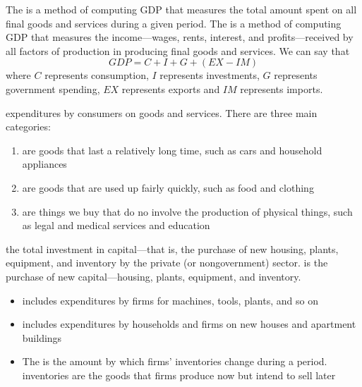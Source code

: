 \documentclass{article}
\begin{document}
The  is a method of computing GDP that measures the total amount spent on all final goods and services during a given period. The  is a method of computing GDP that measures the income---wages, rents, interest, and profits---received by all factors of production in producing final goods and services. We can say that $$GDP = C + I + G + (EX - IM)$$ where $C$ represents consumption, $I$ represents investments, $G$ represents government spending, $EX$ represents exports and $IM$ represents imports. 

\begin{definition}
  expenditures by consumers on goods and services. There are three main categories:
  \begin{enumerate}
    \item {} are goods that last a relatively long time, such as cars and household appliances 
    \item {} are goods that are used up fairly quickly, such as food and clothing 
    \item {} are things we buy that do no involve the production of physical things, such as legal and medical services and education
  \end{enumerate}
\end{definition}

\begin{definition}
  the total investment in capital---that is, the purchase of new housing, plants, equipment, and inventory by the private (or nongovernment) sector.  is the purchase of new capital---housing, plants, equipment, and inventory.  
  \begin{itemize}
    \item {} includes expenditures by firms for machines, tools, plants, and so on 
    \item {} includes expenditures by households and firms on new houses and apartment buildings 
    \item The  is the amount by which firms' inventories change during a period. inventories are the goods that firms produce now but intend to sell later 
  \end{itemize}
\end{definition}
\end{document}

